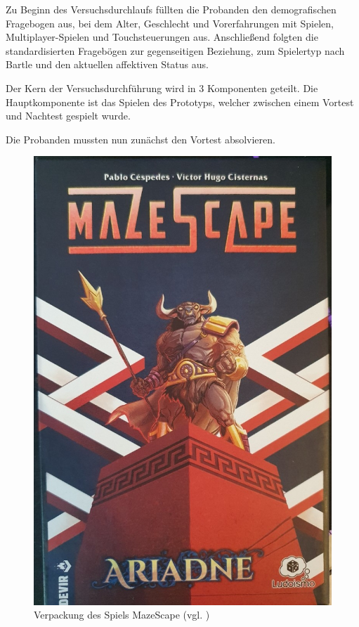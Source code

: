 Zu Beginn des Versuchsdurchlaufs füllten die Probanden den demografischen Fragebogen aus, bei dem Alter, Geschlecht und Vorerfahrungen mit Spielen, Multiplayer-Spielen und Touchsteuerungen aus. Anschließend folgten die standardisierten Fragebögen zur gegenseitigen Beziehung, zum Spielertyp nach Bartle und den aktuellen affektiven Status aus.

Der Kern der Versuchsdurchführung wird in 3 Komponenten geteilt. Die Hauptkomponente ist das Spielen des Prototyps, welcher zwischen einem Vortest und Nachtest gespielt wurde.

Die Probanden mussten nun zunächst den Vortest absolvieren. 

\begin{figure}[ht]
\centering
\includegraphics[width=1\linewidth]{content/pictures/MazeScape.jpg}
\caption{Verpackung des Spiels MazeScape (vgl. \cite{noauthor_mazescape_nodate})}
\label{fig:mazescape}
\end{figure}


